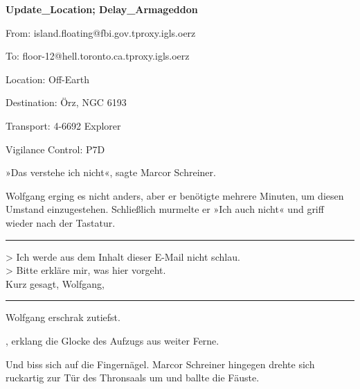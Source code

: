 \begin{itshape}

\textbf{Update\_Location; Delay\_Armageddon}

From: island.floating@fbi.gov.tproxy.igls.oerz

To: floor-12@hell.toronto.ca.tproxy.igls.oerz

Location: Off-Earth

Destination: Örz, NGC 6193

Transport: 4-6692 Explorer

Vigilance Control: P7D

\end{itshape}

»Das verstehe ich nicht«, sagte Marcor Schreiner.

Wolfgang erging es nicht anders, aber er benötigte mehrere Minuten, um diesen Umstand einzugestehen. Schließlich murmelte er »Ich auch nicht« und griff wieder nach der Tastatur.

\noindent \parbox{\textwidth}{ \vspace{3ex} \hrule \vspace{3ex}

    \begin{tiny}
    \begin{ttfamily}

\noindent > Ich werde aus dem Inhalt dieser E-Mail nicht schlau.\\
\noindent > Bitte erkläre mir, was hier vorgeht.\\
\noindent Kurz gesagt, Wolfgang,

    \end{ttfamily}
    \end{tiny}

\vspace{3ex} \hrule \vspace{3ex} }

Wolfgang erschrak zutiefst.

, erklang die Glocke des Aufzugs aus weiter Ferne.

Und biss sich auf die Fingernägel. Marcor Schreiner hingegen drehte sich ruckartig zur Tür des Thronsaals um und ballte die Fäuste.

